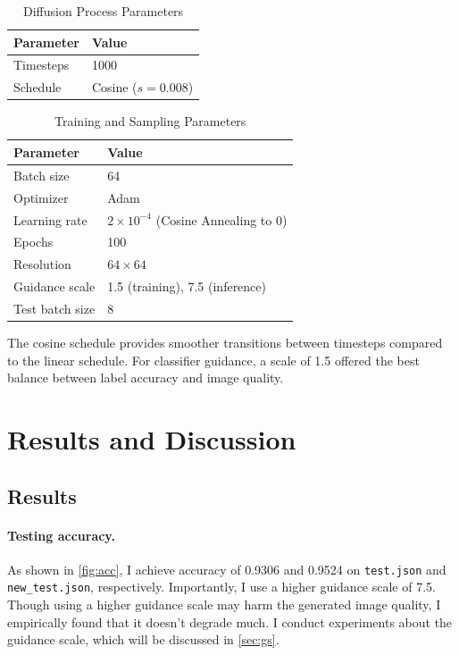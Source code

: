 \documentclass[a4paper,twocolumn]{article}
\begin{document}
\begin{table}[h]
\centering
\caption{Diffusion Process Parameters}
\label{tab:diff_hyperparams}
\begin{tabular}{l|l}
\hline
\textbf{Parameter} & \textbf{Value} \\
\hline
Timesteps & 1000 \\
Schedule & Cosine ($s=0.008$) \\
\hline
\end{tabular}
\end{table}

\begin{table}[h]
\centering
\caption{Training and Sampling Parameters}
\label{tab:train_hyperparams}
\begin{tabular}{l|l}
\hline
\textbf{Parameter} & \textbf{Value} \\
\hline
Batch size & 64 \\
Optimizer & Adam \\
Learning rate & $2 \times 10^{-4}$ (Cosine Annealing to 0) \\
Epochs & 100 \\
Resolution & $64 \times 64$ \\
Guidance scale & 1.5 (training), 7.5 (inference) \\
Test batch size & 8 \\
\hline
\end{tabular}
\end{table}

The cosine schedule provides smoother transitions between timesteps compared to the linear schedule. For classifier guidance, a scale of 1.5 offered the best balance between label accuracy and image quality.

\section{Results and Discussion}

\subsection{Results}

\paragraph{Testing accuracy.} As shown in \autoref{fig:acc}, I achieve accuracy of 0.9306 and 0.9524 on \texttt{test.json} and \texttt{new\_test.json}, respectively. Importantly, I use a higher guidance scale of 7.5. Though using a higher guidance scale may harm the generated image quality, I empirically found that it doesn't degrade much. I conduct experiments about the guidance scale, which will be discussed in \autoref{sec:gs}. 
\end{document}
